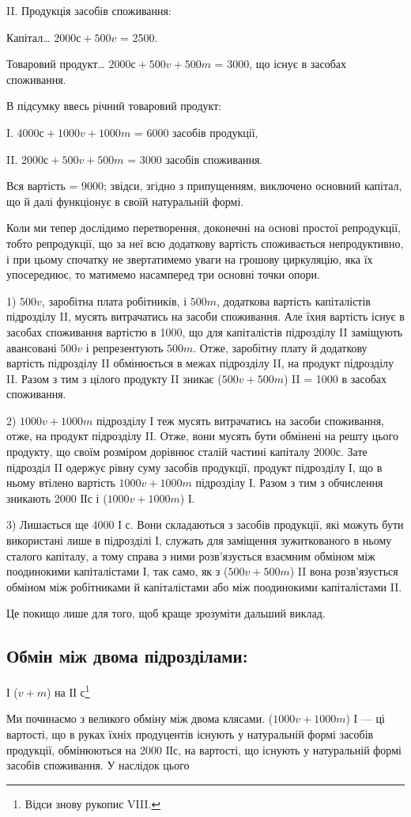 \parcont{}  %
II. Продукція засобів споживання:

Капітал\dots{} $2000с + 500v$ = 2500.

Товаровий продукт\dots{} $2000с + 500v + 500m$ = 3000, що існує в
засобах споживання.

В підсумку ввесь річний товаровий продукт:

I.    $4000с + 1000v + 1000m$ = 6000 засобів продукції,

II.    $2000с + 500v + 500m$ = 3000 засобів споживання.

Вся вартість = 9000; звідси, згідно з припущенням, виключено основний
капітал, що й далі функціонує в своїй натуральній формі.

Коли ми тепер дослідимо перетворення, доконечні на основі простої
репродукції, тобто репродукції, що за неї всю додаткову вартість
споживається непродуктивно, і при цьому спочатку не звертатимемо уваги
на грошову циркуляцію, яка їх упосереднює, то матимемо насамперед
три основні точки опори.

1) $500v$, заробітна плата робітників, і $500m$, додаткова вартість капіталістів
підрозділу II, мусять витрачатись на засоби споживання. Але
їхня вартість існує в засобах споживання вартістю в 1000, що для капіталістів
підрозділу II заміщують авансовані $500v$ і репрезентують $500m$.
Отже, заробітну плату й додаткову вартість підрозділу II обмінюється
в межах підрозділу II, на продукт підрозділу II. Разом з тим з цілого
продукту II зникає ($500v + 500m$) II = 1000 в засобах споживання.

2) $1000v + 1000m$ підрозділу І теж мусять витрачатись на засоби
споживання, отже, на продукт підрозділу II. Отже, вони мусять бути обмінені
на решту цього продукту, що своїм розміром дорівнює сталій
частині капіталу 2000с. Зате підрозділ II одержує рівну суму засобів
продукції, продукт підрозділу І, що в ньому втілено вартість $1000v +
1000m$ підрозділу І. Разом з тим з обчислення зникають 2000 ІІс і
($1000v + 1000m$) І.

3) Лишається ще 4000 І с. Вони складаються з засобів продукції, які
можуть бути використані лише в підрозділі І, служать для заміщення
зужиткованого в ньому сталого капіталу, а тому справа з ними розв’язується
взаємним обміном між поодинокими капіталістами І, так само, як
з ($500v + 500m$) II вона розв’язується обміном між робітниками й капіталістами
або між поодинокими капіталістами II.

Це покищо лише для того, щоб краще зрозуміти дальший виклад.

\subsection{Обмін між двома підрозділами:}

І ($v + m$) на ІІ с\footnote{
Відси знову рукопис VIII.
}

Ми починаємо з великого обміну між двома клясами. ($1000v +
1000m$) І — ці вартості, що в руках їхніх продуцентів існують у натуральній
формі засобів продукції, обмінюються на 2000 ІІс, на вартості,
що існують у натуральній формі засобів споживання. У наслідок цього
\parbreak{}  %
